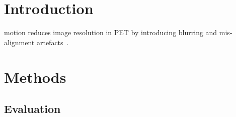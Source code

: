 \section{Introduction} \label{sec:introduction}
     motion reduces image resolution in \gls{PET} by introducing blurring and mis-alignment artefacts~\cite{Nehmeh2008a}. 

\section{Methods} \label{sec:methods}
    
    
    \subsection{Evaluation} \label{sec:evaluation}
        

